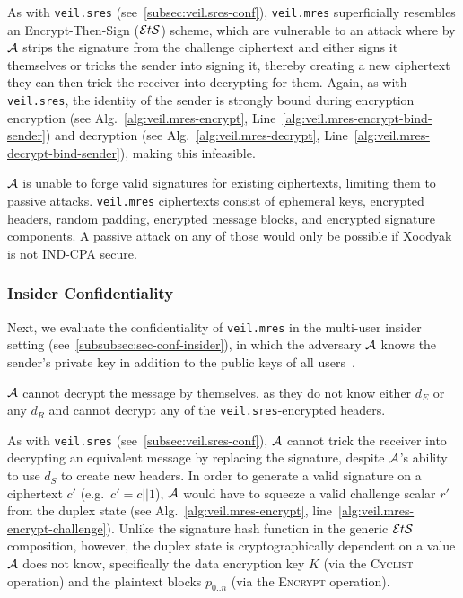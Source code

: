 As with \texttt{veil.sres} (see~\ref{subsec:veil.sres-conf}), \texttt{veil.mres} superficially resembles an
Encrypt-Then-Sign ($\mathcal{E}t\mathcal{S}$) scheme, which are vulnerable to an attack where by $\mathcal{A}$ strips the signature from the
challenge ciphertext and either signs it themselves or tricks the sender into signing it, thereby creating a new
ciphertext they can then trick the receiver into decrypting for them.
Again, as with \texttt{veil.sres}, the identity of the sender is strongly bound during encryption
encryption (see Alg.~\ref{alg:veil.mres-encrypt}, Line~\ref{alg:veil.mres-encrypt-bind-sender}) and decryption
(see Alg.~\ref{alg:veil.mres-decrypt}, Line~\ref{alg:veil.mres-decrypt-bind-sender}), making this infeasible.

$\mathcal{A}$ is unable to forge valid signatures for existing ciphertexts, limiting them to passive attacks.
\texttt{veil.mres} ciphertexts consist of ephemeral keys, encrypted headers, random padding, encrypted message blocks,
and encrypted signature components.
A passive attack on any of those would only be possible if Xoodyak is not IND-CPA secure.

\subsubsection{Insider Confidentiality}

Next, we evaluate the confidentiality of \texttt{veil.mres} in the multi-user insider setting
(see~\ref{subsubsec:sec-conf-insider}), in which the adversary $\mathcal{A}$ knows the sender's private key in addition
to the public keys of all users~\cite[p. 45--46]{baek2010}.

$\mathcal{A}$ cannot decrypt the message by themselves, as they do not know either $d_E$ or any $d_R$ and cannot decrypt
any of the \texttt{veil.sres}-encrypted headers.

As with \texttt{veil.sres} (see~\ref{subsec:veil.sres-conf}),
$\mathcal{A}$ cannot trick the receiver into decrypting an equivalent message by replacing the signature, despite
$\mathcal{A}$'s ability to use $d_S$ to create new headers.
In order to generate a valid signature on a ciphertext $c'$ (e.g.\ $c'=c||1$), $\mathcal{A}$ would have to squeeze a
valid challenge scalar $r'$ from the duplex state (see Alg.~\ref{alg:veil.mres-encrypt},
line~\ref{alg:veil.mres-encrypt-challenge}).
Unlike the signature hash function in the generic $\mathcal{E}t\mathcal{S}$ composition, however, the duplex state is cryptographically
dependent on a value $\mathcal{A}$ does not know, specifically the data encryption key $K$ (via the \textsc{Cyclist}
operation) and the plaintext blocks $p_{0..n}$ (via the \textsc{Encrypt} operation).

